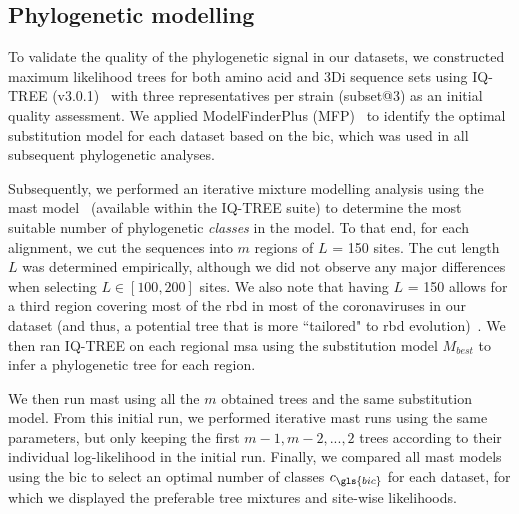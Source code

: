\subsection{Phylogenetic modelling}

To validate the quality of the phylogenetic signal in our datasets, we constructed maximum likelihood trees for both amino acid and 3Di sequence sets using IQ-TREE (v3.0.1)~\cite{wong2025} with three representatives per strain (subset@3) as an initial quality assessment. We applied ModelFinderPlus (MFP)~\cite{kalyaanamoorthy2017} to identify the optimal substitution model for each dataset based on the \gls{bic}, which was used in all subsequent phylogenetic analyses.






Subsequently, we performed an iterative mixture modelling analysis using the \gls{mast} model~\cite{wong2024} (available within the IQ-TREE suite) to determine the most suitable number of phylogenetic \emph{classes} in the model. To that end, for each alignment, we cut the sequences into $m$ regions of $L$ = 150 sites. The cut length $L$ was determined empirically, although we did not observe any major differences when selecting $L \in [100, 200]$ sites. We also note that having $L$ = 150 allows for a third region covering most of the \gls{rbd} in most of the coronaviruses in our dataset (and thus, a potential tree that is more ``tailored" to \gls{rbd} evolution)~\cite{lan2020, catanzaro2025}. We then ran IQ-TREE on each regional \gls{msa} using the substitution model $M_{best}$ to infer a phylogenetic tree for each region. 

We then run \gls{mast} using all the $m$ obtained trees and the same substitution model. From this initial run, we performed iterative \gls{mast} runs using the same parameters, but only keeping the first $m - 1, m - 2, ..., 2$ trees according to their individual log-likelihood in the initial run. Finally, we compared all \gls{mast} models using the \gls{bic} to select an optimal number of classes $c_{\gls{bic}}$ for each dataset, for which we displayed the preferable tree mixtures and site-wise likelihoods. %

